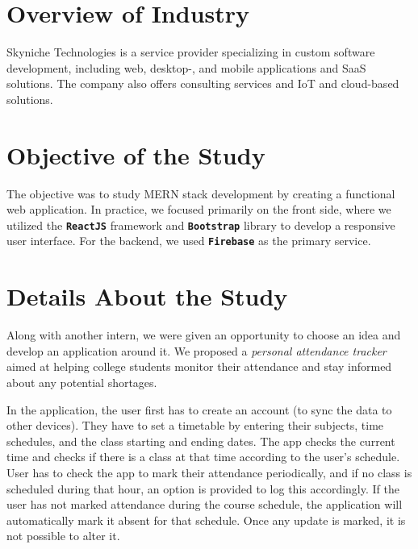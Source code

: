 \documentclass[12pt, a4paper]{article}
\newcommand{\ttbold}[1]{\textbf{\texttt{#1}}}
\begin{document}
\section*{Overview of Industry}
Skyniche Technologies is a service provider specializing in custom software development, including web, desktop-, and mobile applications and SaaS solutions.
The company also offers consulting services and IoT and cloud-based solutions.

\section*{Objective of the Study}
The objective was to study MERN stack development by creating a functional web application.
In practice, we focused primarily on the front side, where we utilized the \ttbold{ReactJS} framework and \ttbold{Bootstrap} library to develop a responsive user interface.
For the backend, we used \ttbold{Firebase} as the primary service.

\section*{Details About the Study}
Along with another intern, we were given an opportunity to choose an idea and develop an application around it.
We proposed a \textit{personal attendance tracker} aimed at helping college students monitor their attendance and stay informed about any potential shortages.

In the application, the user first has to create an account (to sync the data to other devices).
They have to set a timetable by entering their subjects, time schedules, and the class starting and ending dates.
The app checks the current time and checks if there is a class at that time according to the user's schedule.
User has to check the app to mark their attendance periodically, and if no class is scheduled during that hour, an option is provided to log this accordingly.
If the user has not marked attendance during the course schedule, the application will automatically mark it absent for that schedule.
Once any update is marked, it is not possible to alter it.
\end{document}
